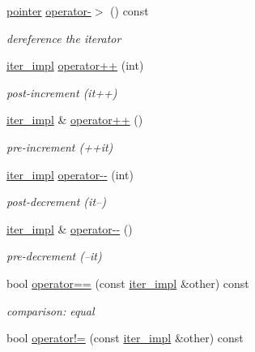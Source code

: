 \begin{DoxyCompactItemize}
\hyperlink{classnlohmann_1_1detail_1_1iter__impl_a69e52f890ce8c556fd68ce109e24b360}{pointer} \hyperlink{classnlohmann_1_1detail_1_1iter__impl_a6da3d2b34528aff328f3dcb513076dec}{operator-\/$>$} () const
\begin{DoxyCompactList}\small\item\em dereference the iterator \end{DoxyCompactList}\item 
\hyperlink{classnlohmann_1_1detail_1_1iter__impl}{iter\+\_\+impl} \hyperlink{classnlohmann_1_1detail_1_1iter__impl_ae64452217b17567717039a158f8bc029}{operator++} (int)
\begin{DoxyCompactList}\small\item\em post-\/increment (it++) \end{DoxyCompactList}\item 
\hyperlink{classnlohmann_1_1detail_1_1iter__impl}{iter\+\_\+impl} \& \hyperlink{classnlohmann_1_1detail_1_1iter__impl_abdfe2a7f464400a7ab572782d14b922f}{operator++} ()
\begin{DoxyCompactList}\small\item\em pre-\/increment (++it) \end{DoxyCompactList}\item 
\hyperlink{classnlohmann_1_1detail_1_1iter__impl}{iter\+\_\+impl} \hyperlink{classnlohmann_1_1detail_1_1iter__impl_ab8479a4395bb0ab3661d842a9ee47767}{operator-\/-\/} (int)
\begin{DoxyCompactList}\small\item\em post-\/decrement (it--) \end{DoxyCompactList}\item 
\hyperlink{classnlohmann_1_1detail_1_1iter__impl}{iter\+\_\+impl} \& \hyperlink{classnlohmann_1_1detail_1_1iter__impl_a84e689fb581d651d130039f7cb81494a}{operator-\/-\/} ()
\begin{DoxyCompactList}\small\item\em pre-\/decrement (--it) \end{DoxyCompactList}\item 
bool \hyperlink{classnlohmann_1_1detail_1_1iter__impl_a2b592605b63ae7f5401996ffa3b14393}{operator==} (const \hyperlink{classnlohmann_1_1detail_1_1iter__impl}{iter\+\_\+impl} \&other) const
\begin{DoxyCompactList}\small\item\em comparison\+: equal \end{DoxyCompactList}\item 
bool \hyperlink{classnlohmann_1_1detail_1_1iter__impl_aeab0e2b5da70b3bdebecd5b1a6ee66a6}{operator!=} (const \hyperlink{classnlohmann_1_1detail_1_1iter__impl}{iter\+\_\+impl} \&other) const

\end{DoxyCompactItemize}
